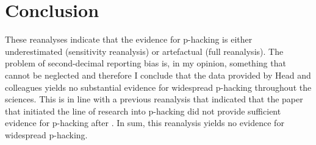 \section*{Conclusion}
These reanalyses indicate that the evidence for p-hacking is either underestimated (sensitivity reanalysis) or artefactual  (full reanalysis). The problem of second-decimal reporting bias is, in my opinion, something that cannot be neglected and therefore I conclude that the data provided by Head and colleagues yields no substantial evidence for widespread p-hacking throughout the sciences. This is in line with a previous reanalysis that indicated that the paper that initiated the line of research into p-hacking \cite{Masicampo2012} did not provide sufficient evidence for p-hacking after \cite{Lakens2014}. In sum, this reanalysis yields no evidence for widespread p-hacking.
  
